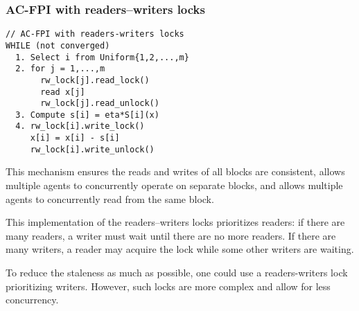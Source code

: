 \documentclass[10pt,mathserif]{beamer}
\begin{document}
\begin{frame}[fragile]
\frametitle{AC-FPI with readers--writers locks}
\begin{lstlisting}
// AC-FPI with readers-writers locks
WHILE (not converged)
  1. Select i from Uniform{1,2,...,m}
  2. for j = 1,...,m
       rw_lock[j].read_lock()
       read x[j]
       rw_lock[j].read_unlock()
  3. Compute s[i] = eta*S[i](x)
  4. rw_lock[i].write_lock()
     x[i] = x[i] - s[i]
     rw_lock[i].write_unlock()
\end{lstlisting}
This mechanism ensures the reads and writes of all blocks are consistent, allows multiple agents to concurrently operate on separate blocks, and allows multiple agents to concurrently read from the same block.
\end{frame}

\begin{frame}

This implementation of the readers--writers locks prioritizes readers: if there are many readers, a writer must wait until there are no more readers. If there are many writers, a reader may acquire the lock while some other writers are waiting. 
\bigskip

To reduce the staleness as much as possible, one could use a readers-writers lock prioritizing writers. However, such locks are more complex and allow for less concurrency.
\end{frame}
\end{document}
